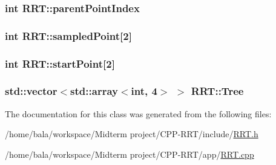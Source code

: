 \subsubsection[{\texorpdfstring{parent\+Point\+Index}{parentPointIndex}}]{\setlength{\rightskip}{0pt plus 5cm}int R\+R\+T\+::parent\+Point\+Index}\hypertarget{classRRT_a93596f78ae0f49d4f54c61ec5b50c2f8}{}\label{classRRT_a93596f78ae0f49d4f54c61ec5b50c2f8}
\subsubsection[{\texorpdfstring{sampled\+Point}{sampledPoint}}]{\setlength{\rightskip}{0pt plus 5cm}int R\+R\+T\+::sampled\+Point\mbox{[}2\mbox{]}}\hypertarget{classRRT_a319220aada572c19cbbd2cfe0eb99c6d}{}\label{classRRT_a319220aada572c19cbbd2cfe0eb99c6d}
\subsubsection[{\texorpdfstring{start\+Point}{startPoint}}]{\setlength{\rightskip}{0pt plus 5cm}int R\+R\+T\+::start\+Point\mbox{[}2\mbox{]}}\hypertarget{classRRT_a85de597c47f635ac1804a7e2c98f717b}{}\label{classRRT_a85de597c47f635ac1804a7e2c98f717b}
\subsubsection[{\texorpdfstring{Tree}{Tree}}]{\setlength{\rightskip}{0pt plus 5cm}std\+::vector$<$std\+::array$<$int, 4$>$ $>$ R\+R\+T\+::\+Tree}\hypertarget{classRRT_a6ac6f3ad0727baaa8a17a2ee64e5bd2b}{}\label{classRRT_a6ac6f3ad0727baaa8a17a2ee64e5bd2b}


The documentation for this class was generated from the following files\+:\begin{DoxyCompactItemize}
\item 
/home/bala/workspace/\+Midterm project/\+C\+P\+P-\/\+R\+R\+T/include/\hyperlink{RRT_8h}{R\+R\+T.\+h}\item 
/home/bala/workspace/\+Midterm project/\+C\+P\+P-\/\+R\+R\+T/app/\hyperlink{RRT_8cpp}{R\+R\+T.\+cpp}\end{DoxyCompactItemize}
